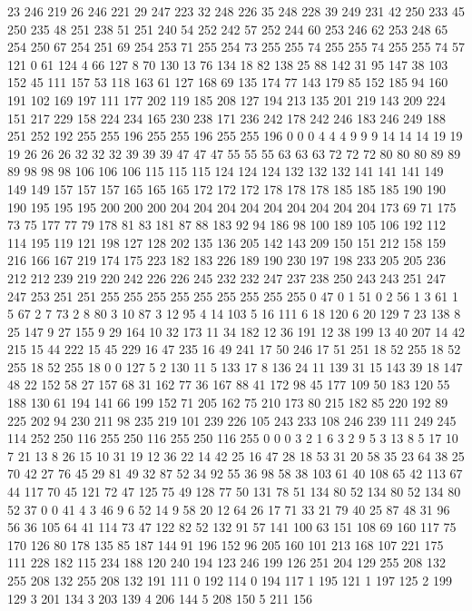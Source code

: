 23 246 219 26 246 221 29 247 223 32 248 226 35 248 228 39 249 231 42 250 233 45 250 235 48 251 238 51 251 240 54 252 242 57 252 244 60 253 246 62 253 248 65 254 250 67 254 251 69 254 253 71 255 254 73 255 255 74 255 255 74 255 255 74 57 121 0 61 124 4 66 127 8 70 130 13 76 134 18 82 138 25 88 142 31 95 147 38 103 152 45 111 157 53 118 163 61 127 168 69 135 174 77 143 179 85 152 185 94 160 191 102 169 197 111 177 202 119 185 208 127 194 213 135 201 219 143 209 224 151 217 229 158 224 234 165 230 238 171 236 242 178 242 246 183 246 249 188 251 252 192 255 255 196 255 255 196 255 255 196 0 0 0 4 4 4 9 9 9 14 14 14 19 19 19 26 26 26 32 32 32 39 39 39 47 47 47 55 55 55 63 63 63 72 72 72 80 80 80 89 89 89 98 98 98 106 106 106 115 115 115 124 124 124 132 132 132 141 141 141 149 149 149 157 157 157 165 165 165 172 172 172 178 178 178 185 185 185 190 190 190 195 195 195 200 200 200 204 204 204 204 204 204 204 204 204 
173 69 71 175 73 75 177 77 79 178 81 83 181 87 88 183 92 94 186 98 100 189 105 106 192 112 114 195 119 121 198 127 128 202 135 136 205 142 143 209 150 151 212 158 159 216 166 167 219 174 175 223 182 183 226 189 190 230 197 198 233 205 205 236 212 212 239 219 220 242 226 226 245 232 232 247 237 238 250 243 243 251 247 247 253 251 251 255 255 255 255 255 255 255 255 255 0 47 0 1 51 0 2 56 1 3 61 1 5 67 2 7 73 2 8 80 3 10 87 3 12 95 4 14 103 5 16 111 6 18 120 6 20 129 7 23 138 8 25 147 9 27 155 9 29 164 10 32 173 11 34 182 12 36 191 12 38 199 13 40 207 14 42 215 15 44 222 15 45 229 16 47 235 16 49 241 17 50 246 17 51 251 18 52 255 18 52 255 18 52 255 18 0 0 127 5 2 130 11 5 133 17 8 136 24 11 139 31 15 143 39 18 147 48 22 152 58 27 157 68 31 162 77 36 167 88 41 172 98 45 177 109 50 183 120 55 188 130 61 194 141 66 199 152 71 205 162 75 210 173 80 215 182 85 220 192 
89 225 202 94 230 211 98 235 219 101 239 226 105 243 233 108 246 239 111 249 245 114 252 250 116 255 250 116 255 250 116 255 0 0 0 3 2 1 6 3 2 9 5 3 13 8 5 17 10 7 21 13 8 26 15 10 31 19 12 36 22 14 42 25 16 47 28 18 53 31 20 58 35 23 64 38 25 70 42 27 76 45 29 81 49 32 87 52 34 92 55 36 98 58 38 103 61 40 108 65 42 113 67 44 117 70 45 121 72 47 125 75 49 128 77 50 131 78 51 134 80 52 134 80 52 134 80 52 37 0 0 41 4 3 46 9 6 52 14 9 58 20 12 64 26 17 71 33 21 79 40 25 87 48 31 96 56 36 105 64 41 114 73 47 122 82 52 132 91 57 141 100 63 151 108 69 160 117 75 170 126 80 178 135 85 187 144 91 196 152 96 205 160 101 213 168 107 221 175 111 228 182 115 234 188 120 240 194 123 246 199 126 251 204 129 255 208 132 255 208 132 255 208 132 191 111 0 192 114 0 194 117 1 195 121 1 197 125 2 199 129 3 201 134 3 203 139 4 206 144 5 208 150 5 211 156 

